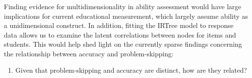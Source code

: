 \documentclass[12pt]{article}
\begin{document}
Finding evidence for multidimensionality in ability assessment would have large implications for current educational measurement, which largely assume ability as a unidimensional construct. In addition, fitting the IRTree model to response data allows us to examine the latent correlations between nodes for items and students. This would help shed light on the currently sparse findings concerning the relationship between accuracy and problem-skipping: 

\begin{enumerate}
    \item[\textbf{RQ2:}] Given that problem-skipping and accuracy are distinct, how are they related? 
\end{enumerate}



\end{document}
